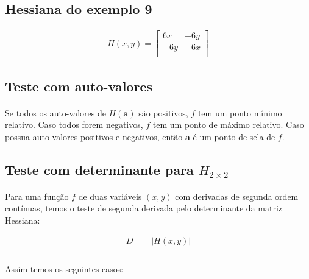 \documentclass{article}
\begin{document}
        \subsection{Hessiana do exemplo 9}
            \begin{align*}
                H(x, y) = 
                \left[
                    \begin{matrix}
                        6x & -6y\\
                        -6y & -6x\\
                    \end{matrix}
                \right]
            \end{align*}

        \subsection{Teste com auto-valores}
            \paragraph{}
            Se todos os auto-valores de $H(\textbf{a})$ são positivos, $f$ tem um ponto mínimo relativo. Caso todos forem negativos,
            $f$ tem um ponto de máximo relativo. Caso possua auto-valores positivos e negativos, então $\textbf{a}$ é um ponto de 
            sela de $f$.

        \subsection{Teste com determinante para $H_{2 \times 2}$}
            \paragraph{}
            Para uma função $f$ de duas variáveis $(x, y)$ com derivadas de segunda ordem contínuas, temos o teste de segunda derivada
            pelo determinante da matriz Hessiana:

            \begin{align*}
                D &= \left| H(x, y) \right|\\
            \end{align*}
            
            \paragraph{}
            Assim temos os seguintes casos:
\end{document}
